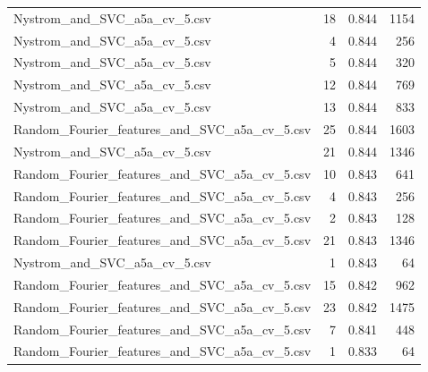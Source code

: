 \begin{tabularx}{\textwidth}{lrrr}
                Nystrom\_and\_SVC\_a5a\_cv\_5.csv &       18 &               0.844 &          1154 \\
                Nystrom\_and\_SVC\_a5a\_cv\_5.csv &        4 &               0.844 &           256 \\
                Nystrom\_and\_SVC\_a5a\_cv\_5.csv &        5 &               0.844 &           320 \\
                Nystrom\_and\_SVC\_a5a\_cv\_5.csv &       12 &               0.844 &           769 \\
                Nystrom\_and\_SVC\_a5a\_cv\_5.csv &       13 &               0.844 &           833 \\
Random\_Fourier\_features\_and\_SVC\_a5a\_cv\_5.csv &       25 &               0.844 &          1603 \\
                Nystrom\_and\_SVC\_a5a\_cv\_5.csv &       21 &               0.844 &          1346 \\
Random\_Fourier\_features\_and\_SVC\_a5a\_cv\_5.csv &       10 &               0.843 &           641 \\
Random\_Fourier\_features\_and\_SVC\_a5a\_cv\_5.csv &        4 &               0.843 &           256 \\
Random\_Fourier\_features\_and\_SVC\_a5a\_cv\_5.csv &        2 &               0.843 &           128 \\
Random\_Fourier\_features\_and\_SVC\_a5a\_cv\_5.csv &       21 &               0.843 &          1346 \\
                Nystrom\_and\_SVC\_a5a\_cv\_5.csv &        1 &               0.843 &            64 \\
Random\_Fourier\_features\_and\_SVC\_a5a\_cv\_5.csv &       15 &               0.842 &           962 \\
Random\_Fourier\_features\_and\_SVC\_a5a\_cv\_5.csv &       23 &               0.842 &          1475 \\
Random\_Fourier\_features\_and\_SVC\_a5a\_cv\_5.csv &        7 &               0.841 &           448 \\
Random\_Fourier\_features\_and\_SVC\_a5a\_cv\_5.csv &        1 &               0.833 &            64 \\
\bottomrule
\end{tabularx}
